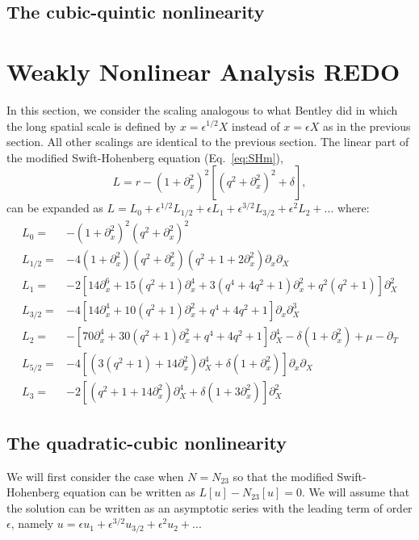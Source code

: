 \documentclass[api,pof,pre,12pt,a4paper]{revtex4-1}
\newcommand{\beqn}{\begin{equation}}
\newcommand{\eeqn}{\end{equation}}
\begin{document}
\subsection{The cubic-quintic nonlinearity}


\section{Weakly Nonlinear Analysis REDO}
In this section, we consider the scaling analogous to what Bentley did in which the long spatial scale is defined by $x=\epsilon^{1/2}X$ instead of $x=\epsilon X$ as in the previous section.  All other scalings are identical to the previous section.
The linear part of the modified Swift-Hohenberg equation (Eq.~\ref{eq:SHm}), 
\beqn
L= r-\left(1+\partial_{x}^2\right)^2 \left[\left(q^2+\partial_{x}^2\right)^2+\delta \right],
\eeqn
can be expanded as $L=L_0+\epsilon^{1/2} L_{1/2}+\epsilon L_1+\epsilon^{3/2} L_{3/2}+\epsilon^2 L_2+...$ where:
\begin{subequations}
\begin{align}
L_0 =& -\left(1+\partial_x^2\right)^2 \left(q^2+\partial_x^2\right)^2 \\
L_{1/2} =& -4\left(1+\partial_x^2\right)  \left(q^2+\partial_x^2\right) \left(q^2+1+2 \partial_x^2\right)\partial_x\partial_X \\
L_1 =&- 2 \left[14 \partial_x^6+15  \left(q^2+1\right)\partial_x^4+3 \left(q^4+4 q^2+1\right) \partial_x^2+q^2\left(q^2+1\right)\right] \partial_X^2\\  
L_{3/2} =& -4   \left[ 14 \partial_x^4+10  \left(q^2+1\right)\partial_x^2+q^4+ 4 q^2+1\right]\partial_x \partial_X^3 \\
L_2 =& -\left[ 70 \partial_x^4+30\left(q^2+1\right) \partial_x^2 +q^4 +4 q^2+1\right]\partial_X^4-\delta\left(1 +\partial_x^2\right)+\mu-\partial_T  \\
L_{5/2} =& -4 \left[ \left(3(q^2+1)+14 \partial_x^2\right)\partial_X^4+\delta(1 +\partial_x^2) \right] \partial_x \partial_X  \\
L_{3} =& -2 \left[ \left(q^2+1+14 \partial_x^2\right)\partial_X^4 +\delta(1 +3 \partial_x^2) \right] \partial_X^2 
\end{align}
\end{subequations}

\subsection{The quadratic-cubic nonlinearity}
We will first consider the case when $N=N_{23}$ so that the modified Swift-Hohenberg equation can be written as $L[u]-N_{23}[u]=0$.  We will assume that the solution can be written as an asymptotic series with the leading term of order $\epsilon$, namely $u=\epsilon u_1 + \epsilon^{3/2} u_{3/2} +\epsilon^2 u_2+...$ 
\end{document}
